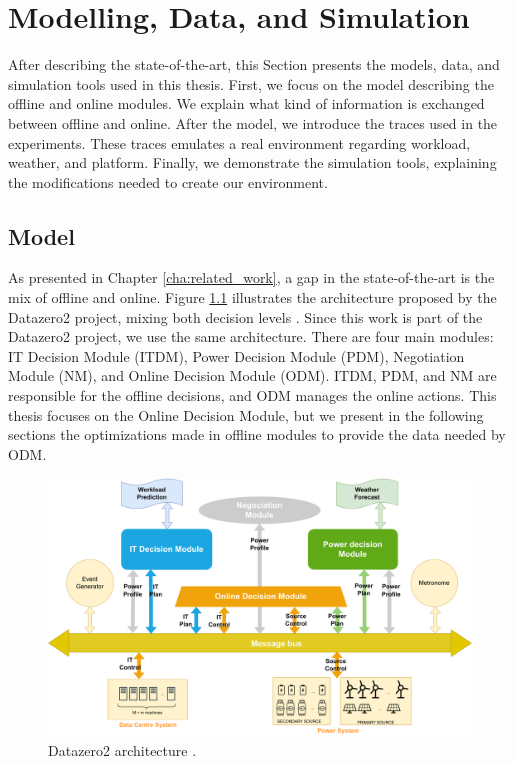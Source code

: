 \chapter{Modelling, Data, and Simulation}
\label{cha:model}

\minitoc

After describing the state-of-the-art, this Section presents the models, data, and simulation tools used in this thesis. First, we focus on the model describing the offline and online modules. We explain what kind of information is exchanged between offline and online. After the model, we introduce the traces used in the experiments. These traces emulates a real environment regarding workload, weather, and platform. Finally, we demonstrate the simulation tools, explaining the modifications needed to create our environment.

\section{Model}

As presented in Chapter \ref{cha:related_work}, a gap in the state-of-the-art is the mix of offline and online. Figure \ref{fig:model} illustrates the architecture proposed by the Datazero2 project, mixing both decision levels \cite{Datazero}. Since this work is part of the Datazero2 project, we use the same architecture. There are four main modules: IT Decision Module (ITDM), Power Decision Module (PDM), Negotiation Module (NM), and Online Decision Module (ODM). ITDM, PDM, and NM are responsible for the offline decisions, and ODM manages the online actions. This thesis focuses on the Online Decision Module, but we present in the following sections the optimizations made in offline modules to provide the data needed by ODM. 

\begin{figure}[!htb]
    \centering
    \includegraphics[scale=0.45]{Images/Model/model.pdf}
    \caption{Datazero2 architecture \cite{Datazero}.}
    \label{fig:model}
\end{figure}

